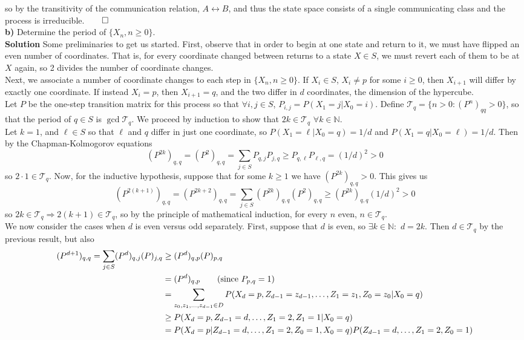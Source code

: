 \documentclass[11pt, letterpaper]{article}
\newcommand{\mbb}[1]{\mathbb{#1}}
\newcommand{\mc}[1]{\mathcal{#1}}
\begin{document}
    so by the transitivity of the communication relation, $A\longleftrightarrow B$, and thus the state space consists of a single communicating class and the process is irreducible.\hfill{$\qed$}\\[10pt]
    {\bf b)} Determine the period of $\{X_n,n\geq 0\}$.\\[10pt]
    {\bf Solution} Some preliminaries to get us started. First, observe that in order to begin at one state and return to it, we must have flipped an even number of coordinates. 
    That is, for every coordinate changed between returns to a state $X\in S$, we must revert each of them to be at $X$ again, so 2 divides the number of coordinate changes.\\[10pt]
    Next, we associate a number of coordinate changes to each step in $\{X_n,n\geq 0\}$. If $X_i\in S$, $X_i\neq p$ for some $i\geq 0$, then $X_{i+1}$ will differ by
    exactly one coordinate. If instead $X_i=p$, then $X_{i+1}=q$, and the two differ in $d$ coordinates, the dimension of the hypercube.\\[10pt]
    Let $P$ be the one-step transition matrix for this process so that $\forall i,j\in S$, $P_{i,j}=P(X_1=j|X_0=i)$. Define $\mc{T}_q=\{n>0:(P^n)_{qq}>0\}$, so that the period of $q\in S$ is $\gcd\mc{T}_q$. We proceed by induction to show that $2k\in\mc{T}_q$ $\forall k\in\mbb{N}$.\\[10pt]
    Let $k=1$, and $\ell\in S$ so that $\ell$ and $q$ differ in just one coordinate, so $P(X_1=\ell|X_0=q)=1/d$ and $P(X_1=q|X_0=\ell)=1/d$. Then by the Chapman-Kolmogorov equations
    \[(P^{2k})_{q,q}=(P^2)_{q,q}=\sum_{j\in S}P_{q,j}P_{j,q}\geq P_{q,\ell}P_{\ell,q}=(1/d)^2>0\]
    so $2\cdot1\in\mc{T}_q$. Now, for the inductive hypothesis, suppose that for some $k\geq 1$ we have $(P^{2k})_{q,q}>0$. This gives us
    \[(P^{2(k+1)})_{q,q}=(P^{2k+2})_{q,q}=\sum_{j\in S}(P^{2k})_{q,q}(P^2)_{q,q}\geq(P^{2k})_{q,q}(1/d)^2>0\]
    so $2k\in\mc{T}_q\Rightarrow 2(k+1)\in\mc{T}_q$, so by the principle of mathematical induction, for every $n$ even, $n\in\mc{T}_q$.\\[10pt]
    We now consider the cases when $d$ is even versus odd separately. First, suppose that $d$ is even, so $\exists k\in\mbb{N}:$ $d=2k$. Then $d\in\mc{T}_q$ by the previous result, but also
    \begin{align*}
        (P^{d+1})_{q,q}=\sum_{j\in S}(P^d)_{q,j}(P)_{j,q}&\geq(P^d)_{q,p}(P)_{p,q}\\
        &=(P^d)_{q,p}\tag{since $P_{p,q}=1$}\\
        &=\sum_{z_0,z_1,\dots,z_{d-1}\in D}P(X_d=p,Z_{d-1}=z_{d-1},\dots,Z_1=z_1,Z_0=z_0|X_0=q)\\
        &\geq P(X_d=p,Z_{d-1}=d,\dots,Z_1=2,Z_1=1|X_0=q)\\
        &=P(X_d=p|Z_{d-1}=d,\dots,Z_1=2,Z_0=1,X_0=q)P(Z_{d-1}=d,\dots,Z_1=2,Z_0=1)
    \end{align*} 
\end{document}
